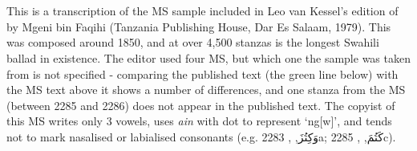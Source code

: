 \documentclass[a4paper, 12pt]{report}
\begin{document}
\begin{center}
 \\
 \\
\vspace{8mm}
\end{center}

\begin{small}
This is a transcription of the MS sample included in Leo van Kessel's edition of  by Mgeni  bin  Faqihi (Tanzania Publishing House, Dar Es Salaam, 1979).  This was composed around 1850, and at over 4,500 stanzas is the longest Swahili ballad in existence.  The editor used four MS, but which one the sample was taken from is not specified - comparing the published text (the green line below) with the MS text above it shows a number of differences, and one stanza from the MS (between 2285 and 2286) does not appear in the published text.  The copyist of this MS writes only 3 vowels, uses \textit{ain} with dot to represent `ng[w]', and tends not to mark nasalised or labialised consonants (e.g.  \textarabic{وَكِتُزَ}, , 2283a; \textarabic{كَتُمَ}, , 2285c).
\end{small}
\vspace{8mm}
\end{document}
